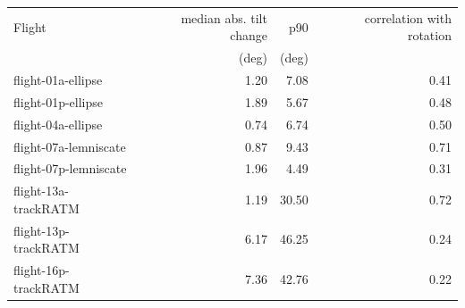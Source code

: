 \begin{tabular}{lrrr}
\toprule
Flight & median abs. tilt change & p90 & correlation with rotation \\
 & (deg) & (deg) & \\
\midrule
flight-01a-ellipse & 1.20 & 7.08 & 0.41 \\
flight-01p-ellipse & 1.89 & 5.67 & 0.48 \\
flight-04a-ellipse & 0.74 & 6.74 & 0.50 \\
flight-07a-lemniscate & 0.87 & 9.43 & 0.71 \\
flight-07p-lemniscate & 1.96 & 4.49 & 0.31 \\
flight-13a-trackRATM & 1.19 & 30.50 & 0.72 \\
flight-13p-trackRATM & 6.17 & 46.25 & 0.24 \\
flight-16p-trackRATM & 7.36 & 42.76 & 0.22 \\
\bottomrule
\end{tabular}
